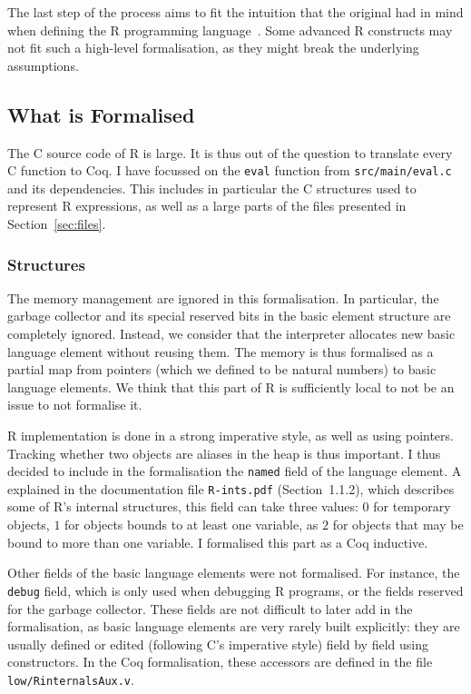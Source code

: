 \documentclass{article}
\newcommand\Coq{Coq}
\newcommand\R{R}
\newcommand\Cn{C}
\begin{document}
The last step of the process aims to fit
the intuition that the original had in mind when defining
the \R{} programming language~\parencite{ihaka1996r}.
Some advanced \R{} constructs may not fit such a high-level formalisation,
as they might break the underlying assumptions.


\subsection{What is Formalised}

The \Cn{} source code of \R{} is large.
It is thus out of the question to translate every \Cn{} function to \Coq{}.
I have focussed on the \texttt{eval} function from
\texttt{src/main/eval.c} and its dependencies.
This includes in particular the \Cn{} structures used to represent
\R{} expressions,
as well as a large parts of the files presented in Section~\ref{sec:files}.

\subsubsection{Structures}

The memory management are ignored in this formalisation.
In particular, the garbage collector and its special reserved bits in the
basic element structure are completely ignored.
Instead, we consider that the interpreter allocates new basic language element
without reusing them.
The memory is thus formalised as a partial map from pointers
(which we defined to be natural numbers)
to basic language elements.
We think that this part of \R{} is sufficiently local to not be an issue
to not formalise it.

\R{} implementation is done in a strong imperative style,
as well as using pointers.
Tracking whether two objects are aliases in the heap is thus important.
I thus decided to include in the formalisation the \texttt{named}
field of the language element.
A explained in the documentation file \texttt{R-ints.pdf}
(Section~1.1.2),
which describes some of \R{}’s internal structures,
this field can take three values:
\(0\) for temporary objects,
\(1\) for objects bounds to at least one variable,
as \(2\) for objects that may be bound to more than one variable.
I formalised this part as a \Coq{} inductive.

Other fields of the basic language elements were not formalised.
For instance, the \texttt{debug} field,
which is only used when debugging \R{} programs,
or the fields reserved for the garbage collector.
These fields are not difficult to later add in the formalisation,
as basic language elements are very rarely built explicitly:
they are usually defined or edited (following \Cn{}’s imperative style)
field by field using constructors.
In the \Coq{} formalisation, these accessors are defined in the file
\texttt{low/RinternalsAux.v}.
\end{document}
